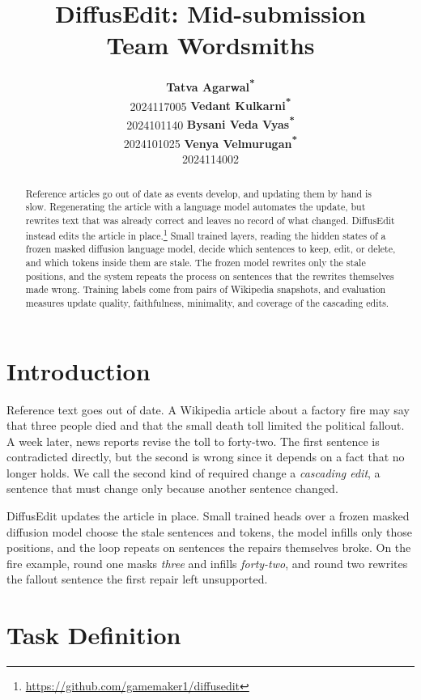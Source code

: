 \documentclass[11pt]{article}
\title{DiffusEdit: Mid-submission \\ Team Wordsmiths}
\author{
  \textbf{Tatva Agarwal\textsuperscript{*}} \\ 2024117005 \And
  \textbf{Vedant Kulkarni\textsuperscript{*}} \\ 2024101140 \And
  \textbf{Bysani Veda Vyas\textsuperscript{*}} \\ 2024101025 \And
  \textbf{Venya Velmurugan\textsuperscript{*}} \\ 2024114002
}
\begin{document}
\maketitle

\renewcommand{\thefootnote}{\fnsymbol{footnote}}
\renewcommand{\thefootnote}{\arabic{footnote}}
\setcounter{footnote}{0}

\begin{abstract}
    Reference articles go out of date as events develop, and updating them by hand is slow. Regenerating the article with a language model automates the update, but rewrites text that was already correct and leaves no record of what changed. DiffusEdit instead edits the article in place.\footnote{\url{https://github.com/gamemaker1/diffusedit}} Small trained layers, reading the hidden states of a frozen masked diffusion language model, decide which sentences to keep, edit, or delete, and which tokens inside them are stale. The frozen model rewrites only the stale positions, and the system repeats the process on sentences that the rewrites themselves made wrong. Training labels come from pairs of Wikipedia snapshots, and evaluation measures update quality, faithfulness, minimality, and coverage of the cascading edits.
\end{abstract}

\section{Introduction}
    Reference text goes out of date. A Wikipedia article about a factory fire may say that three people died and that the small death toll limited the political fallout. A week later, news reports revise the toll to forty-two. The first sentence is contradicted directly, but the second is wrong since it depends on a fact that no longer holds. We call the second kind of required change a \emph{cascading edit}, a sentence that must change only because another sentence changed.
    
    DiffusEdit updates the article in place. Small trained heads over a frozen masked diffusion model choose the stale sentences and tokens, the model infills only those positions, and the loop repeats on sentences the repairs themselves broke. On the fire example, round one masks \emph{three} and infills \emph{forty-two}, and round two rewrites the fallout sentence the first repair left unsupported.
    
\section{Task Definition}
\label{sec:problem}
\end{document}
